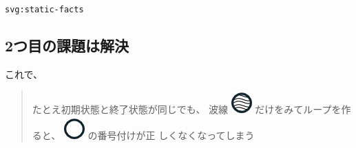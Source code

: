 \texttt{svg:static-facts}

\subsection{2つ目の課題は解決}
\label{sec-2-3}

これで、

\begin{quote}
たとえ初期状態と終了状態が同じでも、
波線 \includegraphics[width=.9\linewidth]{img/wave-circle.png} だけをみてループを作ると、 \includegraphics[width=.9\linewidth]{img/white-circle.png} の番号付けが正
しくなくなってしまう
\end{quote}

